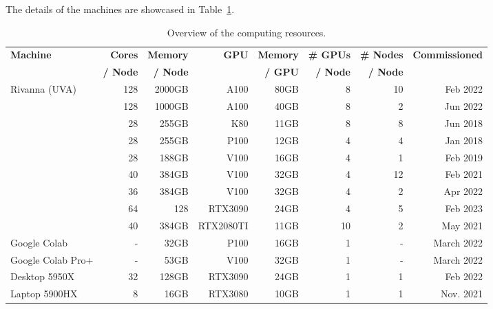 \documentclass[utf8]{FrontiersinVancouver} %
\begin{document}
The details of the machines are showcased in Table~\ref{tab:hwoverview}.

\begin{table}
    \caption{Overview of the computing resources.}
    \label{tab:hwoverview}
    \begin{center}
    {\footnotesize
    \begin{tabular}{|l|r|r|r|r|r|r|r|}
        \hline
            {\bf Machine}  & {\bf Cores} & {\bf Memory} & {\bf GPU}   &   {\bf Memory} & {\bf \# GPUs} & {\bf \# Nodes}  & {\bf Commissioned} \\ 
                     &  {\bf / Node} & {\bf / Node}  &  & {\bf / GPU} & {\bf / Node}     &   {\bf / Node}        &  \\
        \hline
        \hline
        Rivanna (UVA)    & 128 & 2000GB   & A100 & 80GB &  8  & 10 & Feb 2022 \\
                        & 128 & 1000GB   & A100 & 40GB &  8  &  2 & Jun 2022  \\   
                        & 28  & 255GB    & K80  & 11GB &  8  &  8 & Jun 2018         \\
                        & 28  & 255GB    & P100 & 12GB &  4  &  4 & Jan 2018         \\
                        & 28  & 188GB    & V100 & 16GB &  4  &  1 & Feb 2019          \\
                        & 40  & 384GB    & V100 & 32GB &  4  & 12 & Feb 2021          \\
                        & 36  & 384GB    & V100 & 32GB &  4  &  2 & Apr 2022          \\
                        &  64 & 128     & RTX3090   & 24GB    & 4   &  5 & Feb 2023         \\
                        & 40  & 384GB    & RTX2080TI & 11GB & 10  &  2 & May 2021 \\                        
         \hline
         Google Colab      & -   & 32GB      & P100      & 16GB    & 1 & - & March 2022 \\
         Google Colab Pro+ & -   & 53GB      & V100      & 32GB    & 1 & - & March 2022 \\
         \hline
         Desktop 5950X     &  32 & 128GB     & RTX3090   & 24GB    & 1 & 1 & Feb 2022   \\
         \hline
         Laptop 5900HX     &   8 & 16GB      & RTX3080   & 10GB    & 1 & 1 & Nov. 2021 \\
         \hline
    \end{tabular}
    }
    \end{center}


\end{table}
\end{document}

